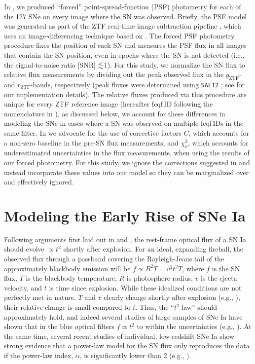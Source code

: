 \documentclass[twocolumn]{./aastex63}
\newcommand{\rztf}{$r_\mathrm{ZTF}$}
\newcommand{\gztf}{$g_\mathrm{ZTF}$}
\begin{document}
In \citet{Yao19}, we produced ``forced'' point-spread-function (PSF)
photometry for each of the 127 SNe on every image where the SN was observed.
Briefly, the PSF model was generated as part of the ZTF real-time image
subtraction pipeline \citep{Masci19}, which uses an image-differencing
technique based on \citet{Zackay16}. The forced PSF photometry procedure
fixes the position of each SN and measures the PSF flux in all images that
contain the SN position, even in epochs where the SN is not detected (i.e.,
the signal-to-noise ratio [SNR] $\lesssim$1). For this study, we normalize the SN
flux to relative flux measurements by dividing out the peak observed flux in
the \gztf- and \rztf-bands, respectively (peak fluxes were determined using
\texttt{SALT2} \citealt{Guglielmo93}; see \citealt{Yao19} for our
implementation details). The relative fluxes produced via this procedure are
unique for every ZTF reference image (hereafter fcqf\,ID following the
nomenclature in \citealt{Yao19}), as discussed below, we account for these
differences in modeling the SNe in cases where a SN was observed on multiple
fcqf\,IDs in the same filter. In \citet{Yao19} we advocate for the use of
corrective factors $C$, which accounts for a non-zero baseline in the pre-SN
flux measurements, and $\chi^2_{\nu}$, which accounts for underestimated
uncertainties in the flux measurements, when using the results of our forced
photometry. For this study, we ignore the corrections suggested in
\citet{Yao19} and instead incorporate these values into our model so they can
be marginalized over and effectively ignored.

\section{Modeling the Early Rise of SNe Ia}\label{sec:model}

Following arguments first laid out in \citet{Goldhaber98a} and
\citet{Riess99a}, the rest-frame optical flux of a SN Ia should evolve
$\propto t^2$ shortly after explosion. For an ideal, expanding fireball, the
observed flux through a passband covering the Rayleigh-Jeans tail of the
approximately blackbody emission will be $f \propto R^2 T = v^2 t^2 T$, where
$f$ is the SN flux, $T$ is the blackbody temperature, $R$ is photosphere
radius, $v$ is the ejecta velocity, and $t$ is time since explosion. While
these idealized conditions are not perfectly met in nature, $T$ and $v$
clearly change shortly after explosion (e.g., \citealt{Parrent12}), their
relative change is small compared to $t$. Thus, the ``$t^2$-law'' should
approximately hold, and indeed several studies of large samples of SNe Ia
have shown that in the blue optical filters $f \propto t^2$ to within the
uncertainties (e.g., \citealt{Conley06, Hayden10, Ganeshalingam11}). At the
same time, several recent studies of individual, low-redshift SNe Ia show
strong evidence that a power-law model for the SN flux only reproduces the
data if the power-law index, $\alpha$, is significantly lower than 2 (e.g.,
\citealt{Zheng13,Zheng14,Shappee16,Miller18,Fausnaugh19}).
\end{document}
